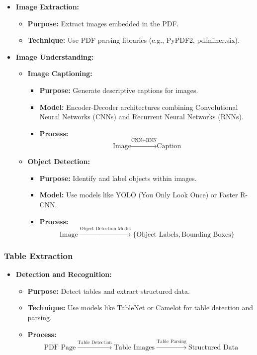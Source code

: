 \documentclass[12pt]{article}
\begin{document}
\begin{itemize}
    \item \textbf{Image Extraction:}
    \begin{itemize}
        \item \textbf{Purpose:} Extract images embedded in the PDF.
        \item \textbf{Technique:} Use PDF parsing libraries (e.g., PyPDF2, pdfminer.six).
    \end{itemize}
    \item \textbf{Image Understanding:}
    \begin{itemize}
        \item \textbf{Image Captioning:}
        \begin{itemize}
            \item \textbf{Purpose:} Generate descriptive captions for images.
            \item \textbf{Model:} Encoder-Decoder architectures combining Convolutional Neural Networks (CNNs) and Recurrent Neural Networks (RNNs).
            \item \textbf{Process:}
            \[
            \text{Image} \xrightarrow{\text{CNN+RNN}} \text{Caption}
            \]
        \end{itemize}
        \item \textbf{Object Detection:}
        \begin{itemize}
            \item \textbf{Purpose:} Identify and label objects within images.
            \item \textbf{Model:} Use models like YOLO (You Only Look Once) or Faster R-CNN.
            \item \textbf{Process:}
            \[
            \text{Image} \xrightarrow{\text{Object Detection Model}} \{\text{Object Labels}, \text{Bounding Boxes}\}
            \]
        \end{itemize}
    \end{itemize}
\end{itemize}

\subsubsection{Table Extraction}

\begin{itemize}
    \item \textbf{Detection and Recognition:}
    \begin{itemize}
        \item \textbf{Purpose:} Detect tables and extract structured data.
        \item \textbf{Technique:} Use models like TableNet or Camelot for table detection and parsing.
        \item \textbf{Process:}
        \[
        \text{PDF Page} \xrightarrow{\text{Table Detection}} \text{Table Images} \xrightarrow{\text{Table Parsing}} \text{Structured Data}
        \]
    \end{itemize}
\end{itemize}
\end{document}
